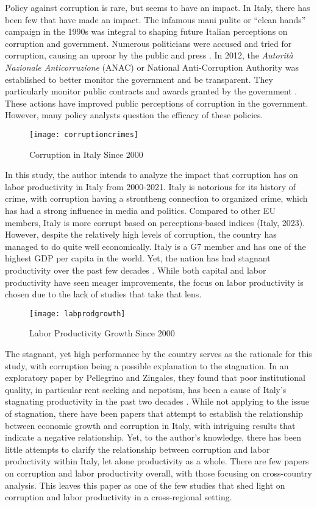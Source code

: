 \documentclass[12pt]{article} %
\begin{document}
Policy against corruption is rare, but seems to have an impact. In Italy, there has been few that have made an impact. The infamous mani pulite or “clean hands” campaign in the 1990s was integral to shaping future Italian perceptions on corruption and government. Numerous politicians were accused and tried for corruption, causing an uproar by the public and press  \citep{vannucci_controversial_2009}. In 2012, the \emph{Autorità Nazionale Anticorruzione} (ANAC) or National Anti-Corruption Authority was established to better monitor the government and be transparent. They particularly monitor public contracts and awards granted by the government \citep{anac_anac_2023}. These actions have improved public perceptions of corruption in the government. However, many policy analysts question the efficacy of these policies.

\begin{figure}[h]
	\centering
	\caption{Corruption in Italy Since 2000}
	\texttt{[image: corruptioncrimes]}
\end{figure}

In this study, the author intends to analyze the impact that corruption has on labor productivity in Italy from 2000-2021. Italy is notorious for its history of crime, with corruption having a strontheng connection to organized crime, which has had a strong influence in media and politics. Compared to other EU members, Italy is more corrupt based on perceptions-based indices (Italy, 2023). However, despite the relatively high levels of corruption, the country has managed to do quite well economically. Italy is a G7 member and has one of the highest GDP per capita in the world. Yet, the nation has had stagnant productivity over the past few decades \citep{oecd_classifying_2019}. While both capital and labor productivity have seen meager improvements, the focus on labor productivity is chosen due to the lack of studies that take that lens.

\begin{figure}[h]
	\centering
	\caption{Labor Productivity Growth Since 2000}
	\texttt{[image: labprodgrowth]}
\end{figure}

The stagnant, yet high performance by the country serves as the rationale for this study, with corruption being a possible explanation to the stagnation. In an exploratory paper by Pellegrino and Zingales, they found that poor institutional quality, in particular rent seeking and nepotism, has been a cause of Italy’s stagnating productivity in the past two decades \citep{pellegrino_diagnosing_2017}. While not applying to the issue of stagnation, there have been papers that attempt to establish the relationship between economic growth and corruption in Italy, with intriguing results that indicate a negative relationship. Yet, to the author’s knowledge, there has been little attempts to clarify the relationship between corruption and labor productivity within Italy, let alone productivity as a whole. There are few papers on corruption and labor productivity overall, with those focusing on cross-country analysis. This leaves this paper as one of the few studies that shed light on corruption and labor productivity in a cross-regional setting.
\end{document}
